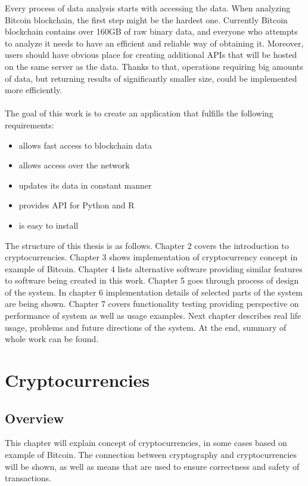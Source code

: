 \documentclass[12pt, en, eng, oneside]{mgr}
\begin{document}
Every process of data analysis starts with accessing the data. When analyzing Bitcoin blockchain, the first step might be the hardest one. Currently Bitcoin blockchain contains over 160GB of raw binary data, and everyone who attempts to analyze it needs to have an efficient and reliable way of obtaining it. Moreover, users should have obvious place for creating additional APIs that will be hosted on the same server as the data. Thanks to that, operations requiring big amounts of data, but returning results of significantly smaller size, could be implemented more efficiently.
\\
\\
The goal of this work is to create an application that fulfills the following requirements: 
\begin{itemize}

\item
allows fast access to blockchain data
\item
allows access over the network
\item
updates its data in constant manner
\item
provides API for Python and R
\item
is easy to install

\end{itemize}

The structure of this thesis is as follows. Chapter 2 covers the introduction to cryptocurrencies. Chapter 3 shows implementation of cryptocurrency concept in example of Bitcoin. Chapter 4 lists alternative software providing similar features to software being created in this work. Chapter 5 goes through process of design of the system. In chapter 6 implementation details of selected parts of the system are being shown. Chapter 7 covers functionality testing providing perspective on performance of system as well as usage examples. Next chapter describes real life usage, problems and future directions of the system. At the end, summary of whole work can be found. 

\chapter{Cryptocurrencies}

\section{Overview}
This chapter will explain concept of cryptocurrencies, in some cases based on example of Bitcoin. The connection between cryptography and cryptocurrencies will be shown, as well as means that are used to ensure correctness and safety of transactions.
\end{document}
